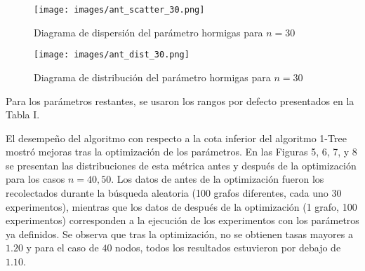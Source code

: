 \documentclass[conference]{IEEEtran}
\begin{document}
    \begin{figure}[htbp]
      \centering
      \begin{minipage}[t]{0.45\linewidth}
        \centering
        \texttt{[image: images/ant\_scatter\_30.png]}
        \caption{Diagrama de dispersión del parámetro hormigas para $n=30$}
        \label{fig:image29}
      \end{minipage}
      \hfill
      \begin{minipage}[t]{0.45\linewidth}
        \centering
        \texttt{[image: images/ant\_dist\_30.png]}
        \caption{Diagrama de distribución del parámetro hormigas para $n=30$}
        \label{fig:image30}
      \end{minipage}
    \end{figure}
Para los parámetros restantes, se usaron los rangos por defecto presentados en la Tabla I.
\begin{table}[h]
\centering
{}
\caption{Rangos óptimos de parámetros definidos visualmente}
\label{tab:table3}
\end{table}

El desempeño del algoritmo con respecto a la cota inferior del algoritmo 1-Tree mostró mejoras tras la optimización de los parámetros. En las Figuras 5, 6, 7, y 8 se presentan las distribuciones de esta métrica antes y después de la optimización para los casos $n=40, 50$. Los datos de antes de la optimización fueron los recolectados durante la búsqueda aleatoria (100 grafos diferentes, cada uno 30 experimentos), mientras que los datos de después de la optimización (1 grafo, 100 experimentos) corresponden a la ejecución de los experimentos con los parámetros ya definidos. Se observa que tras la optimización, no se obtienen tasas mayores a $1.20$ y para el caso de $40$ nodos, todos los resultados estuvieron por debajo de $1.10$.
\end{document}
